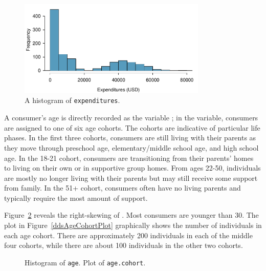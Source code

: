 \begin{figure}[h]
	\centering
	\includegraphics[width=0.8\textwidth]{ch_intro_to_data_oi_biostat/figures/ddsExpHist/ddsExpHist}
	\caption{A histogram of \texttt{expenditures}. }
	\label{ddsExpHist}
\end{figure}


A consumer's age is directly recorded as the variable ; in the  variable, consumers are assigned to one of six age cohorts. The cohorts are indicative of particular life phases. In the first three cohorts, consumers are still living with their parents as they move through preschool age, elementary/middle school age, and high school age. In the 18-21 cohort, consumers are transitioning from their parents' homes to living on their own or in supportive group homes. From ages 22-50, individuals are mostly no longer living with their parents but may still receive some support from family. In the 51+ cohort, consumers often have no living parents and typically require the most amount of support.

Figure~\ref{ddsAge} reveals the right-skewing of . Most consumers are younger than 30. The plot in Figure~\ref{ddsAgeCohortPlot} graphically shows the number of individuals in each age cohort. There are approximately 200 individuals in each of the middle four cohorts, while there are about 100 individuals in the other two cohorts.

\begin{figure}[ht]
	\centering
	\caption{ Histogram of \texttt{age}.  Plot of \texttt{age.cohort}.}
	\label{ddsAge}
\end{figure}

